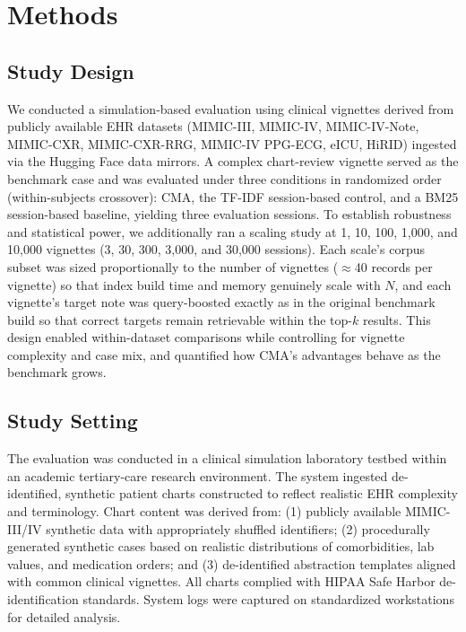 \documentclass[preprint,12pt]{elsarticle}
\begin{document}
\section{Methods}

\subsection{Study Design}
We conducted a simulation-based evaluation using clinical vignettes derived from publicly available EHR datasets (MIMIC-III, MIMIC-IV, MIMIC-IV-Note, MIMIC-CXR, MIMIC-CXR-RRG, MIMIC-IV PPG-ECG, eICU, HiRID) ingested via the Hugging Face data mirrors. A complex chart-review vignette served as the benchmark case and was evaluated under three conditions in randomized order (within-subjects crossover): CMA, the TF-IDF session-based control, and a BM25 session-based baseline, yielding three evaluation sessions. To establish robustness and statistical power, we additionally ran a scaling study at 1, 10, 100, 1{,}000, and 10{,}000 vignettes (3, 30, 300, 3{,}000, and 30{,}000 sessions). Each scale's corpus subset was sized proportionally to the number of vignettes ($\approx$40 records per vignette) so that index build time and memory genuinely scale with $N$, and each vignette's target note was query-boosted exactly as in the original benchmark build so that correct targets remain retrievable within the top-$k$ results. This design enabled within-dataset comparisons while controlling for vignette complexity and case mix, and quantified how CMA's advantages behave as the benchmark grows.

\subsection{Study Setting}
The evaluation was conducted in a clinical simulation laboratory testbed within an academic tertiary-care research environment. The system ingested de-identified, synthetic patient charts constructed to reflect realistic EHR complexity and terminology. Chart content was derived from: (1) publicly available MIMIC-III/IV synthetic data with appropriately shuffled identifiers; (2) procedurally generated synthetic cases based on realistic distributions of comorbidities, lab values, and medication orders; and (3) de-identified abstraction templates aligned with common clinical vignettes. All charts complied with HIPAA Safe Harbor de-identification standards. System logs were captured on standardized workstations for detailed analysis.
\end{document}
